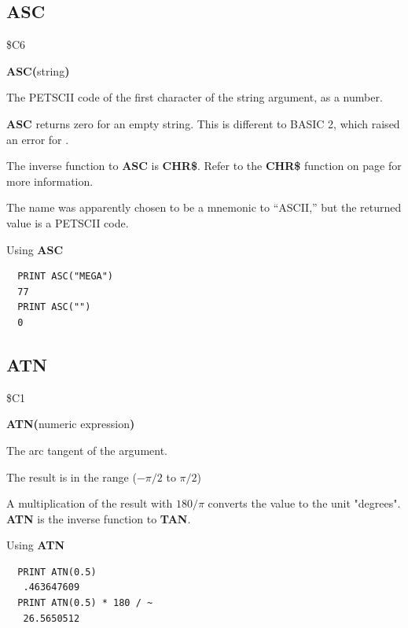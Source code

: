 \subsection{ASC}
\begin{description}[leftmargin=2cm,style=nextline]
\item [Token:] \$C6
\item [Format:] {\bf ASC(}string{\bf)}
\item [Returns:] The PETSCII code of the first character of
               the string argument, as a number.
\item [Remarks:]
               {\bf ASC} returns zero for an empty string. This is different
               to BASIC 2, which raised an error for .

               The inverse function to {\bf ASC} is {\bf CHR\$}.
               Refer to the {\bf CHR\$} function on page \pageref{BASIC 65 Functions!CHR}
               for more information.

               The name was apparently chosen to be a mnemonic to ``ASCII,''
               but the returned value is a PETSCII code.

\item [Examples:] Using {\bf ASC}
\begin{tcolorbox}[colback=black,coltext=white]
\verbatimfont{\codefont}
\begin{verbatim}
  PRINT ASC("MEGA")
  77
  PRINT ASC("")
  0
\end{verbatim}
\end{tcolorbox}
\end{description}


\newpage
\subsection{ATN}
\begin{description}[leftmargin=2cm,style=nextline]
\item [Token:] \$C1
\item [Format:] {\bf ATN(}numeric expression{\bf)}
\item [Returns:] The arc tangent of the argument.

               The result is in the range ($-\pi/2$ to $\pi/2$)

\item [Remarks:]
               A multiplication of the result with $180/\pi$
               converts the value to the unit "degrees".
               {\bf ATN} is the inverse function to {\bf TAN}.
\item [Examples:] Using {\bf ATN}
\begin{tcolorbox}[colback=black,coltext=white]
\verbatimfont{\codefont}
\begin{verbatim}
  PRINT ATN(0.5)
   .463647609
  PRINT ATN(0.5) * 180 / ~
   26.5650512
\end{verbatim}
\end{tcolorbox}
\end{description}

